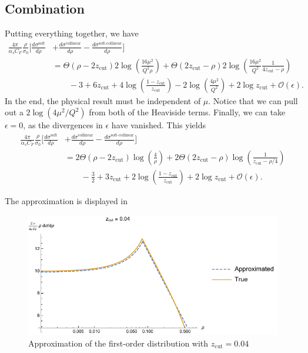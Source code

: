 \documentclass[11pt,twoside,reqno]{amsart}
\theoremstyle{plain}
\theoremstyle{remark}
\theoremstyle{definition}
\theoremstyle{remark}
\theoremstyle{definition}
\theoremstyle{definition}
\newcommand{\cO}{\mathcal{O}}
\newcommand{\zcut}{z_\mathrm{cut}}
\begin{document}
\subsection{Combination}

	Putting everything together, we have
	\begin{equation}
	\begin{aligned}
		\frac{4\pi}{\alpha_s C_F} \frac{\rho}{\sigma_0}\bigg[\frac{d\sigma^\text{soft}}{d\rho} &+ \frac{d\sigma^\text{collinear}}{d\rho} - \frac{d\sigma^\text{soft-collinear}}{d\rho}\bigg] \\
			&= \Theta(\rho - 2\zcut)2\log(\frac{16\mu^2}{Q^2\rho}) + \Theta(2\zcut - \rho)2\log(\frac{16\mu^2}{Q^2}\frac{1}{4\zcut - \rho}) \\
			&\qquad-3 + 6\zcut + 4\log(\frac{1 - \zcut}{\zcut}) - 2\log(\frac{4\mu^2}{Q^2}) + 2\log\zcut + \cO(\epsilon).
	\end{aligned}
	\end{equation}
	In the end, the physical result must be independent of $\mu$. Notice that we can pull out a $2\log(4\mu^2/Q^2)$ from both of the Heaviside terms. Finally, we can take $\epsilon = 0$, as the divergences in $\epsilon$ have vanished. This yields
	\begin{equation}
	\begin{aligned}
		\frac{4\pi}{\alpha_s C_F} \frac{\rho}{\sigma_0}\bigg[\frac{d\sigma^\text{soft}}{d\rho} &+ \frac{d\sigma^\text{collinear}}{d\rho} - \frac{d\sigma^\text{soft-collinear}}{d\rho}\bigg] \\
			&= 2\Theta(\rho - 2\zcut)\log(\frac{4}{\rho}) + 2\Theta(2\zcut - \rho)\log(\frac{1}{\zcut - \rho/4}) \\
			&\qquad-\frac{3}{2} + 3\zcut + 2\log(\frac{1 - \zcut}{\zcut}) + 2\log\zcut + \cO(\epsilon).
	\end{aligned}
	\end{equation}

	The approximation is displayed in

	\begin{figure}
		\includegraphics[width=\textwidth]{plots/approximation.pdf}
		\caption{Approximation of the first-order distribution with $\zcut = 0.04$}
	\end{figure}




\end{document}
